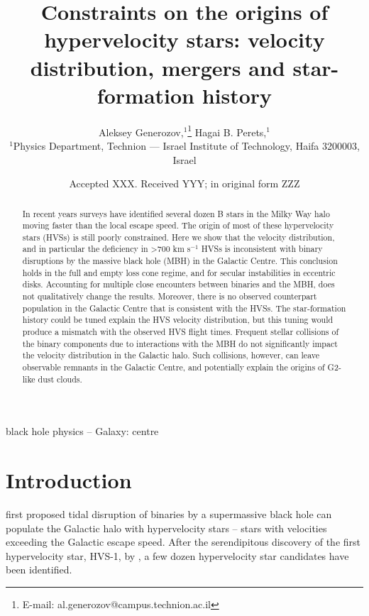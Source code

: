 \documentclass[fleqn,usenatbib]{mnras}
\title[Constraints on the origins of hypervelocity stars]{Constraints on the origins of hypervelocity stars: velocity distribution, mergers and star-formation history}
\author[Generozov \& Perets]{
Aleksey Generozov,$^{1}$\thanks{E-mail: al.generozov@campus.technion.ac.il}
Hagai B. Perets,$^{1}$
\\
$^{1}$Physics Department, Technion — Israel Institute of Technology, Haifa 3200003, Israel\\
}
\date{Accepted XXX. Received YYY; in original form ZZZ}
\begin{document}
\label{firstpage}
\pagerange{\pageref{firstpage}--\pageref{lastpage}}
\maketitle

\begin{abstract}
In recent years surveys have identified several dozen B stars in the Milky Way halo moving faster than the local escape speed. 
The origin of most of these hypervelocity stars (HVSs) is still poorly constrained. Here we show that the velocity distribution, and in particular the deficiency in >700 km s$^{-1}$ HVSs is inconsistent with binary disruptions by the massive black hole (MBH) in the Galactic Centre. This conclusion holds in the full and empty loss cone regime, and for secular instabilities in eccentric disks. Accounting for multiple close encounters between binaries and the MBH, does not qualitatively change the results. Moreover, there is no observed counterpart population in the Galactic Centre that is consistent with the HVSs. The star-formation history could be tuned explain the HVS velocity distribution, but this tuning would produce a mismatch with the observed HVS flight times. Frequent stellar collisions of the binary components due to interactions with the MBH do not significantly impact the velocity distribution in the Galactic halo. Such  collisions, however,  can leave observable remnants in the Galactic Centre, and potentially explain the origins of G2-like dust clouds. 
\end{abstract}
\begin{keywords}
black hole physics -- Galaxy: centre
\end{keywords}



\section{Introduction}

\cite{hills1988} first proposed tidal disruption of binaries by a supermassive black hole can populate the Galactic halo with hypervelocity stars -- stars with velocities exceeding the Galactic escape speed. After the serendipitous discovery of the first hypervelocity star, HVS-1, by \citet{warren_brown+2005}, a few dozen hypervelocity star candidates have been identified.
\end{document}
